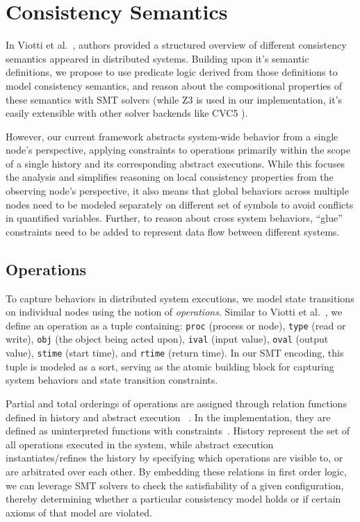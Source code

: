 \section{Consistency Semantics}

In Viotti et al.~\cite{viotti2016consistency}, authors provided a
structured overview
of different consistency semantics appeared in distributed systems. Building
upon it's semantic definitions, we propose to use predicate logic derived from
those definitions to model consistency semantics, and reason about the
compositional properties of these semantics with SMT solvers (while Z3
  \cite{demoura2008z3} is used in our implementation, it's easily
  extensible with other
solver backends like CVC5 \cite{barbosa2022cvc5}).


However, our current framework abstracts system-wide behavior from a single
node's perspective, applying constraints to operations primarily within the
scope of a single history and its corresponding abstract executions. While this
focuses the analysis and simplifies reasoning on local consistency properties
from the observing node's perspective, it also means that global behaviors
across multiple nodes need to be modeled separately on different set of symbols
to avoid conflicts in quantified variables. Further, to reason about cross
system behaviors, ``glue'' constraints need to be added to represent data flow
between different systems.

\subsection{Operations}

To capture behaviors in distributed system executions, we model state
transitions on individual nodes using the notion of
\textit{operations}. Similar to
Viotti et al.~\cite{viotti2016consistency}, we define an operation as a tuple
containing: \texttt{proc} (process or node), \texttt{type} (read or
write), \texttt{obj} (the object
being acted upon), \texttt{ival} (input value), \texttt{oval} (output
value), \texttt{stime}
(start time), and \texttt{rtime} (return time). In our SMT encoding,
this tuple is
modeled as a sort, serving as the atomic building block for capturing system
behaviors and state transition constraints.

Partial and total orderings of operations are assigned through relation
functions defined in history and abstract
execution~\cite{burckhardt2014principles}
\cite{viotti2016consistency}. In the implementation, they are defined
as uninterpreted
functions with constraints~\cite{bryant2002modeling}. History
represent the set of all
operations executed in the system, while abstract execution instantiates/refines
the history by specifying which operations are visible to, or are arbitrated
over each other. By embedding these relations in first order logic, we can
leverage SMT solvers to check the satisfiability of a given configuration,
thereby determining whether a particular consistency model holds or if certain
axioms of that model are violated.

